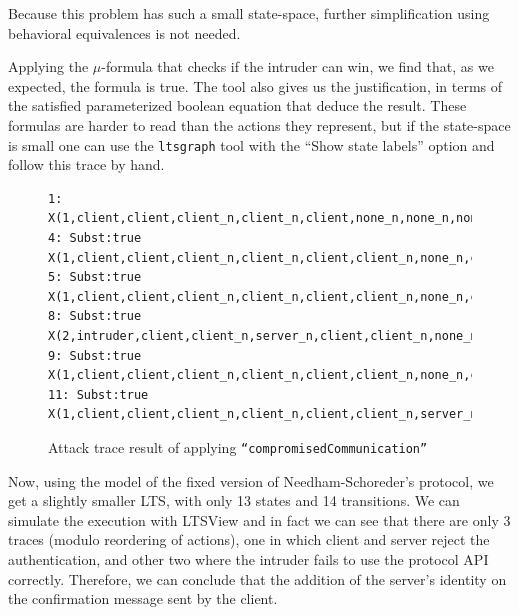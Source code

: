 \documentclass[11pt]{article}
\theoremstyle{definition}
\theoremstyle{plain}
\begin{document}
\begin{appendices}
Because this problem has such a small state-space, further simplification using behavioral equivalences is not needed.

Applying the $ \mu $-formula that checks if the intruder can win, we find that, as we expected, the formula is true. The tool also gives us the justification, in terms of the satisfied parameterized boolean equation that deduce the result. These formulas are harder to read than the actions they represent, but if the state-space is small one can use the \texttt{ltsgraph} tool with the ``Show state labels'' option and follow this trace by hand.

\begin{figure}
\small{
\begin{lstlisting}
1: X(1,client,client,client_n,client_n,client,none_n,none_n,none,false,1,client,client_n,client,intruder,1,client,client,client_n,client_n,client,client)
4: Subst:true X(1,client,client,client_n,client_n,client,client_n,none_n,client,false,2,client,client_n,client,intruder,1,client,client,client_n,client_n,client,client)
5: Subst:true X(1,client,client,client_n,client_n,client,client_n,none_n,client,false,2,client,client_n,client,intruder,2,server,intruder,client_n,server_n,client,intruder)
8: Subst:true X(2,intruder,client,client_n,server_n,client,client_n,none_n,client,false,2,client,client_n,client,intruder,3,client,client,client_n,client_n,client,intruder)
9: Subst:true X(1,client,client,client_n,client_n,client,client_n,none_n,client,false,3,client,server_n,intruder,intruder,3,client,client,client_n,client_n,client,intruder)
11: Subst:true X(1,client,client,client_n,client_n,client,client_n,server_n,client,false,4,client,client_n,client,client,3,client,client,client_n,client_n,client,intruder)
\end{lstlisting}}
\caption{Attack trace result of applying \texttt{``compromisedCommunication''}}
\end{figure}

Now, using the model of the fixed version of Needham-Schoreder's protocol, we get a slightly smaller LTS, with only 13 states and 14 transitions. We can simulate the execution with LTSView and in fact we can see that there are only 3 traces (modulo reordering of actions), one in which client and server reject the authentication, and other two where the intruder fails to use the protocol API correctly. Therefore, we can conclude that the addition of the server's identity on the confirmation message sent by the client.


\end{appendices}
\end{document}
